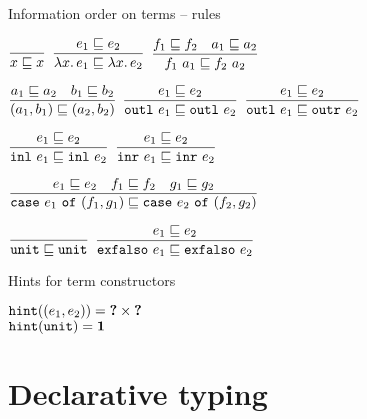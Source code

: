 \documentclass{beamer}
\begin{document}
\begin{frame}{Information order on terms -- rules}

\begin{center}
  $\displaystyle \frac{}{x \sqsubseteq x} \textsc{\footnotesize{}}$ \quad
  $\displaystyle \frac{e_1 \sqsubseteq e_2}{\lambda x.\, e_1 \sqsubseteq \lambda x.\, e_2} \textsc{\footnotesize{}}$ \quad
  $\displaystyle \frac{f_1 \sqsubseteq f_2 \quad a_1 \sqsubseteq a_2}{f_1\ a_1 \sqsubseteq f_2\ a_2} \textsc{\footnotesize{}}$

  \vspace{2em}

  $\displaystyle \frac{a_1 \sqsubseteq a_2 \quad b_1 \sqsubseteq b_2}{(a_1, b_1) \sqsubseteq (a_2, b_2)} \textsc{\footnotesize{}}$ \quad
  $\displaystyle \frac{e_1 \sqsubseteq e_2}{\texttt{outl}\ e_1 \sqsubseteq \texttt{outl}\ e_2} \textsc{\footnotesize{}}$ \quad
  $\displaystyle \frac{e_1 \sqsubseteq e_2}{\texttt{outl}\ e_1 \sqsubseteq \texttt{outr}\ e_2} \textsc{\footnotesize{}}$

  \vspace{2em}

  $\displaystyle \frac{e_1 \sqsubseteq e_2}{\texttt{inl}\ e_1 \sqsubseteq \texttt{inl}\ e_2} \textsc{\footnotesize{}}$ \quad
  $\displaystyle \frac{e_1 \sqsubseteq e_2}{\texttt{inr}\ e_1 \sqsubseteq \texttt{inr}\ e_2} \textsc{\footnotesize{}}$

  \vspace{2em}

  $\displaystyle \frac{e_1 \sqsubseteq e_2 \quad f_1 \sqsubseteq f_2 \quad g_1 \sqsubseteq g_2}{\texttt{case}\ e_1\ \texttt{of}\ (f_1, g_1) \sqsubseteq \texttt{case}\ e_2\ \texttt{of}\ (f_2, g_2)} \textsc{\footnotesize{}}$

  \vspace{2em}

  $\displaystyle \frac{}{\texttt{unit} \sqsubseteq \texttt{unit}} \textsc{\footnotesize{}}$ \quad
  $\displaystyle \frac{e_1 \sqsubseteq e_2}{\texttt{exfalso}\ e_1 \sqsubseteq \texttt{exfalso}\ e_2} \textsc{\footnotesize{}}$
\end{center}

\end{frame}

\begin{frame}{Hints for term constructors}

\begin{center}
  $\texttt{hint}((e_1, e_2)) = \textbf{?} \times \textbf{?}$ \\
  $\texttt{hint}(\texttt{unit}) = \textbf{1}$
\end{center}

\end{frame}

\section{Declarative typing}
\end{document}
